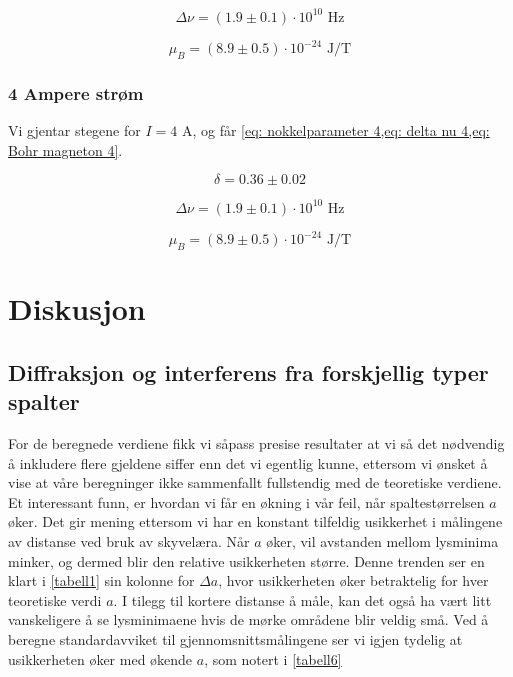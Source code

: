 \documentclass[reprint,norsk,notitlepage,floatfix]{revtex4-2}
\begin{document}
    \begin{equation}\label{eq: delta nu 3}
      Δν = (1.9 ± 0.1) ⋅ 10^{10} \text{ Hz}
    \end{equation}
    
    \begin{equation}\label{eq: Bohr magneton 3}
      μ_B = (8.9 ± 0.5) ⋅ 10^{-24} \text{ J/T}
    \end{equation}
  
  \subsubsection*{4 Ampere strøm}
    Vi gjentar stegene for $I = 4$ A, og får \cref{eq: nokkelparameter 4,eq: delta nu 4,eq: Bohr magneton 4}.
      
    \begin{equation}\label{eq: nokkelparameter 4}
      δ = 0.36 ± 0.02      
    \end{equation}
    
    \begin{equation}\label{eq: delta nu 4}
      Δν = (1.9 ± 0.1) ⋅ 10^{10} \text{ Hz}      
    \end{equation}
    
    \begin{equation}\label{eq: Bohr magneton 4}
      μ_B = (8.9 ± 0.5) ⋅ 10^{-24} \text{ J/T}
    \end{equation}
  
    


\section{Diskusjon} \label{sec: diskusjon}
  \subsection{Diffraksjon og interferens fra forskjellig typer spalter}
  
  For de beregnede verdiene fikk vi såpass presise resultater at vi så det nødvendig å inkludere flere gjeldene siffer enn det vi egentlig kunne, ettersom vi ønsket å vise at våre beregninger ikke sammenfallt fullstendig med de teoretiske verdiene. Et interessant funn, er hvordan vi får en økning i vår feil, når spaltestørrelsen $a$ øker. Det gir mening ettersom vi har en konstant tilfeldig usikkerhet i målingene av distanse ved bruk av skyvelæra. Når $a$ øker, vil avstanden mellom lysminima minker, og dermed blir den relative usikkerheten større. Denne trenden ser en klart i \cref{tabell1} sin kolonne for $Δa$, hvor usikkerheten øker betraktelig for hver teoretiske verdi $a$. I tilegg til kortere distanse å måle, kan det også ha vært litt vanskeligere å se lysminimaene hvis de mørke områdene blir veldig små. Ved å beregne standardavviket til gjennomsnittsmålingene ser vi igjen tydelig at usikkerheten øker med økende $a$, som notert i \cref{tabell6}
  
\end{document}

